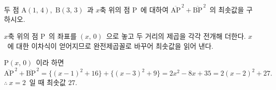 \documentclass[10pt]{article}
\begin{document}

\newpage


\begin{dmproblem}
두 점 $\mathrm{A}(1,\, 4)$,\ $\mathrm{B}(3,\, 3)$\ 과 $x$축 위의 점 $\mathrm{P}$\ 에 대하여 $\overline{\mathrm{AP}}^{\,2} + \overline{\mathrm{BP}}^{\,2}$\ 의 최솟값을 구하시오.
\end{dmproblem}

\begin{dmapproach}
$x$축 위의 점 $\mathrm{P}$\ 의 좌표를 $(x,\, 0)$\ 으로 놓고 두 거리의 제곱을 각각 전개해 더한다. $x$\ 에 대한 이차식이 얻어지므로 완전제곱꼴로 바꾸어 최솟값을 읽어 낸다.
\end{dmapproach}

\begin{dmsolution}
$\mathrm{P}(x,\, 0)$\ 이라 하면
\begin{equation*}
  \overline{\mathrm{AP}}^{\,2} + \overline{\mathrm{BP}}^{\,2} = \{(x-1)^2 + 16\} + \{(x-3)^2 + 9\} = 2x^2 - 8x + 35 = 2(x - 2)^2 + 27.
\end{equation*}
$\therefore\ x = 2$\ 일 때 최솟값 $27$.
\end{dmsolution}

\dmchecktitle



\newpage

\dmconcepthead
{}
\end{document}
